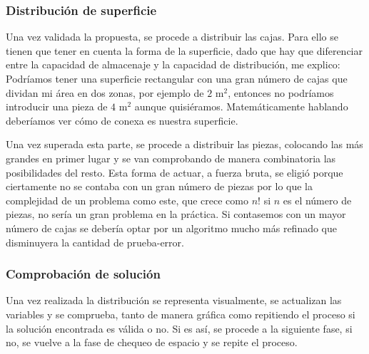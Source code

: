 \subsubsection{Distribución de superficie} 
Una vez validada la propuesta, se procede a distribuir las cajas. Para ello se tienen que tener en cuenta la forma de la superficie, dado que hay que diferenciar entre la capacidad de almacenaje y la capacidad de distribución, me explico: Podríamos tener una superficie rectangular con una gran número de cajas que dividan mi área en dos zonas, por ejemplo de $2$ m$^2$, entonces no podríamos introducir una pieza de $4$ m$^2$ aunque quisiéramos. Matemáticamente hablando deberíamos ver cómo de conexa es nuestra superficie.

Una vez superada esta parte, se procede a distribuir las piezas, colocando las más grandes en primer lugar y se van comprobando de manera combinatoria las posibilidades del resto. Esta forma de actuar, a fuerza bruta, se eligió porque ciertamente no se contaba con un gran número de piezas por lo que la complejidad de un problema como este, que crece como $n!$ si $n$ es el número de piezas, no sería un gran problema en la práctica. Si contasemos con un mayor número de cajas se debería optar por un algoritmo mucho más refinado que disminuyera la cantidad de prueba-error.

\subsubsection{Comprobación de solución}   

Una vez realizada la distribución se representa visualmente, se actualizan las variables y se comprueba, tanto de manera gráfica como repitiendo el proceso si la solución encontrada es válida o no. Si es así, se procede a la siguiente fase, si no, se vuelve a la fase de chequeo de espacio y se repite el proceso.
%
%
